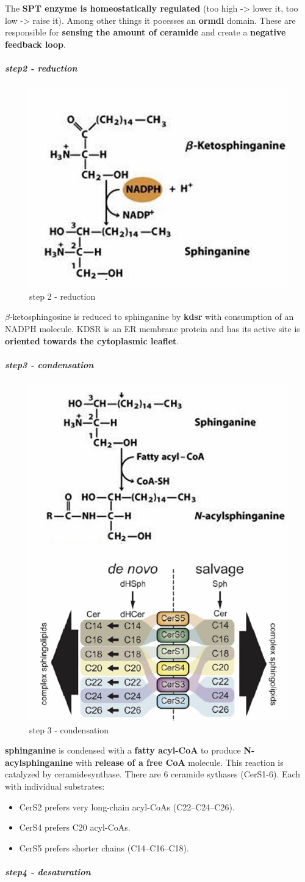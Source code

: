 \documentclass[../main.tex]{subfiles}
\begin{document}
The \textbf{SPT enzyme is homeostatically regulated} (too high -> lower it, too low -> raise it). Among other things it pocesses an \textbf{\gls{ormdl}} domain. These are responsible for \textbf{sensing the amount of ceramide} and create a \textbf{negative feedback loop}.

\subparagraph{step2 - reduction}
\begin{figure}[H]
    \centering
    \includegraphics[width=0.5\linewidth]{step2S.png}
    \caption{step 2 - reduction}
    \label{fig:enter-label}
\end{figure}
$\beta$-ketosphingosine is reduced to 
sphinganine by \textbf{\gls{kdsr}} with 
consumption of an NADPH molecule.  
KDSR is an ER membrane protein and 
has its active site  is \textbf{oriented towards the 
cytoplasmic leaflet}.

\subparagraph{step3 - condensation}
\begin{figure}[H]
    \centering
    \includegraphics[width=0.5\linewidth]{step3S.png}
    \caption{step 3 - condensation}
    \label{fig:enter-label}
\end{figure}
\textbf{sphinganine} is condensed with a \textbf{fatty 
acyl-CoA} to produce \textbf{N-acylsphinganine } with \textbf{release of a free CoA}
molecule. This reaction is catalyzed by \gls{ceramidesynthase}. There are 6 ceramide sythases (CerS1-6). Each with individual substrates:
\begin{itemize}
    \item CerS2 prefers very long-chain acyl-CoAs (C22–C24–C26).
    \item CerS4 prefers C20 acyl-CoAs.
    \item CerS5 prefers shorter chains (C14–C16–C18).
\end{itemize}
\subparagraph{step4 - desaturation}
\end{document}
